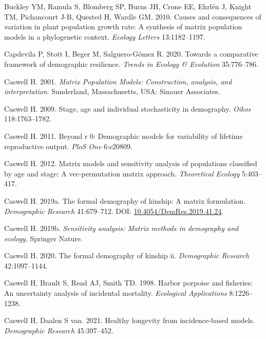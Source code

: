 \documentclass[
  12pt,
  letterpaper,
]{book}
\newlength{\cslhangindent}
\newenvironment{CSLReferences}[2] %
 {\begin{list}{}{%
  \setlength{\itemindent}{0pt}
  \setlength{\leftmargin}{0pt}
  \setlength{\parsep}{0pt}
  \ifodd #1
   \setlength{\leftmargin}{\cslhangindent}
   \setlength{\itemindent}{-1\cslhangindent}
  \fi
  \setlength{\itemsep}{#2\baselineskip}}}
 {\end{list}}
\begin{document}
\begin{CSLReferences}{1}{0}
Buckley YM, Ramula S, Blomberg SP, Burns JH, Crone EE, Ehrlén J, Knight
TM, Pichancourt J-B, Quested H, Wardle GM. 2010. Causes and consequences
of variation in plant population growth rate: A synthesis of matrix
population models in a phylogenetic context. \emph{Ecology {L}etters}
13:1182--1197.

Capdevila P, Stott I, Beger M, Salguero-Gómez R. 2020. Towards a
comparative framework of demographic resilience. \emph{Trends in
{E}cology \& {E}volution} 35:776--786.

Caswell H. 2001. \emph{Matrix {P}opulation {M}odels: Construction,
analysis, and interpretation}. Sunderland, Massachusetts, USA: Sinauer
Associates.

Caswell H. 2009. Stage, age and individual stochasticity in demography.
\emph{Oikos} 118:1763--1782.

Caswell H. 2011. Beyond r 0: {D}emographic models for variability of
lifetime reproductive output. \emph{PloS One} 6:e20809.

Caswell H. 2012. Matrix models and sensitivity analysis of populations
classified by age and stage: A vec-permutation matrix approach.
\emph{Theoretical Ecology} 5:403--417.

Caswell H. 2019a. {The formal demography of kinship: A matrix
formulation}. \emph{Demographic Research} 41:679--712. DOI:
\href{https://doi.org/10.4054/DemRes.2019.41.24}{10.4054/DemRes.2019.41.24}.

Caswell H. 2019b. \emph{Sensitivity analysis: Matrix methods in
demography and ecology}. Springer Nature.

Caswell H. 2020. The formal demography of kinship ii. \emph{Demographic
Research} 42:1097--1144.

Caswell H, Brault S, Read AJ, Smith TD. 1998. Harbor porpoise and
fisheries: An uncertainty analysis of incidental mortality.
\emph{Ecological Applications} 8:1226--1238.

Caswell H, Daalen S van. 2021. Healthy longevity from incidence-based
models. \emph{Demographic Research} 45:397--452.


\end{CSLReferences}
\end{document}
